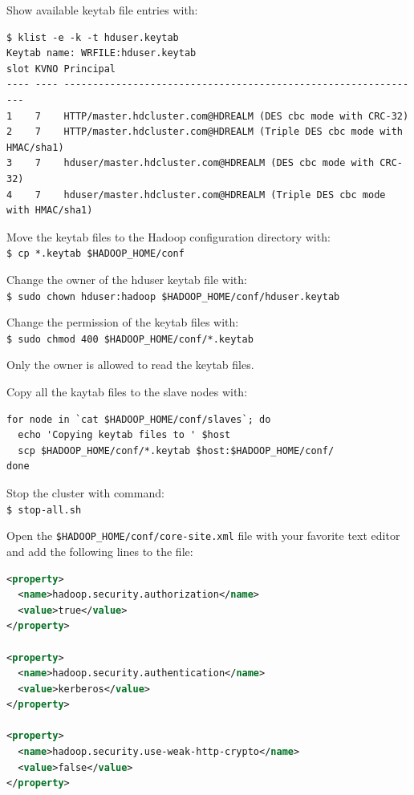 Show available keytab file entries with:
\lstset{style=bashstyle}
\begin{lstlisting}
$ klist -e -k -t hduser.keytab
Keytab name: WRFILE:hduser.keytab
slot KVNO Principal
---- ---- ---------------------------------------------------------------
1    7    HTTP/master.hdcluster.com@HDREALM (DES cbc mode with CRC-32)
2    7    HTTP/master.hdcluster.com@HDREALM (Triple DES cbc mode with HMAC/sha1)
3    7    hduser/master.hdcluster.com@HDREALM (DES cbc mode with CRC-32)
4    7    hduser/master.hdcluster.com@HDREALM (Triple DES cbc mode with HMAC/sha1)
\end{lstlisting}

Move the keytab files to the Hadoop configuration directory with: \\
\verb|$ cp *.keytab $HADOOP_HOME/conf|

Change the owner of the hduser keytab file with:\\
\verb|$ sudo chown hduser:hadoop $HADOOP_HOME/conf/hduser.keytab|

Change the permission of the keytab files with: \\
\verb|$ sudo chmod 400 $HADOOP_HOME/conf/*.keytab|

Only the owner is allowed to read the keytab files.

Copy all the kaytab files to the slave nodes with:
\begin{verbatim}
for node in `cat $HADOOP_HOME/conf/slaves`; do
  echo 'Copying keytab files to ' $host
  scp $HADOOP_HOME/conf/*.keytab $host:$HADOOP_HOME/conf/
done
\end{verbatim}

Stop the cluster with command: \\
\verb|$ stop-all.sh|

Open the \verb|$HADOOP_HOME/conf/core-site.xml| file with your favorite text editor and add the following lines to the file:
\lstset{style=bashstyle}
\begin{lstlisting}[language=XML]
<property>
  <name>hadoop.security.authorization</name>
  <value>true</value>
</property>

<property>
  <name>hadoop.security.authentication</name>
  <value>kerberos</value>
</property>

<property>
  <name>hadoop.security.use-weak-http-crypto</name>
  <value>false</value>
</property>
\end{lstlisting}

